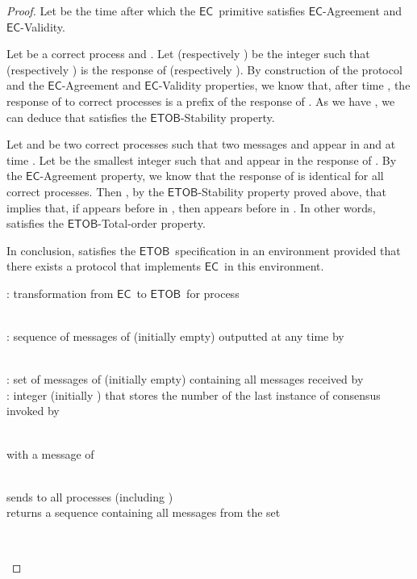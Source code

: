\documentclass[11pt]{article}
\newcommand{\EC}{\ensuremath{\mathsf{EC}}}
\newcommand{\ETOB}{\ensuremath{\mathsf{ETOB}}}
\begin{document}
\begin{proof}
Let  be the time after which the \EC~primitive satisfies \EC-Agreement and \EC-Validity.

Let  be a correct process and . Let  (respectively ) be the integer such that  (respectively ) is the response of  (respectively ). By construction of the protocol and the \EC-Agreement and \EC-Validity properties, we know that, after time , the response of  to correct processes is a prefix of the response of . As we have , we can deduce that  satisfies the \ETOB-Stability property.

Let  and  be two correct processes such that two messages  and  appear in  and  at time . Let  be the smallest integer such that  and  appear in the response of . By the \EC-Agreement property, we know that the response of  is identical for all correct processes. Then , by the \ETOB-Stability property proved above, that implies that, if  appears before  in , then  appears before  in . In other words,  satisfies the \ETOB-Total-order property.

In conclusion,  satisfies the \ETOB~specification in an environment  provided that there exists a protocol that implements \EC~in this environment.

\begin{algorithm}
\caption{: transformation from \EC~to \ETOB~for process }\label{algo:ECtoETOB}
\small
\begin{description}\itemsep0pt
\item[Output variable:]~\\
: sequence of messages of  (initially empty) outputted at any time by 

\item[Internal variables:]~\\
: set of messages of  (initially empty) containing all messages received by ~\\
: integer (initially ) that stores the number of the last instance of consensus invoked by 

\item[Messages:]~\\
  with  a message of 

\item[Functions:]~\\
 sends  to all processes (including )\\
 returns a sequence containing all messages from the set 

\item[On reception of  from the application]~\\



\end{description}
\end{algorithm}
\end{proof}
\end{document}
